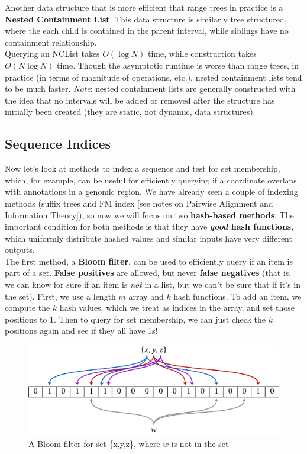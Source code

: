 \documentclass[12pt]{article}
\begin{document}
Another data structure that is more efficient that range trees in practice is a \textbf{Nested Containment List}. This data structure is similarly tree structured, where the each child is contained in the parent interval, while siblings have no containment relationship.\\[10pt]
Querying an NCList takes $O(\log N)$ time, while construction takes $O(N\log N)$ time. Though the asymptotic runtime is worse than range trees, in practice (in terms of magnitude of operations, etc.), nested containment lists tend to be much faster. \textit{Note}: nested containment lists are generally constructed with the idea that no intervals will be added or removed after the structure has initially been created (they are static, not dynamic, data structures).
\subsection{Sequence Indices}
Now let's look at methods to index a sequence and test for set membership, which, for example, can be useful for efficiently querying if a coordinate overlaps with annotations in a genomic region. We have already seen a couple of indexing methods (suffix trees and FM index [see notes on Pairwise Alignment and Information Theory]), so now we will focus on two \textbf{hash-based methods}. The important condition for both methods is that they have \textbf{\textit{good} hash functions}, which uniformly distribute hashed values and similar inputs have very different outputs. \\[10pt]
The first method, a \textbf{Bloom filter}, can be used to efficiently query if an item is part of a set. \textbf{False positives} are allowed, but never \textbf{false negatives} (that is, we can know for sure if an item is \textit{not} in a list, but we can't be sure that if it's in the set). First, we use a length $m$ array and $k$ hash functions. To add an item, we compute the $k$ hash values, which we treat as indices in the array, and set those positions to 1. Then to query for set membership, we can just check the $k$ positions again and see if they all have 1s!\\[10pt]
\begin{figure}[t]
    \centering
    \includegraphics[width=.7\linewidth]{1920px-Bloom_filter.svg.png}
    \caption{A Bloom filter for set \{x,y,z\}, where $w$ is not in the set}
    \label{fig:my_label}
\end{figure}
\end{document}
